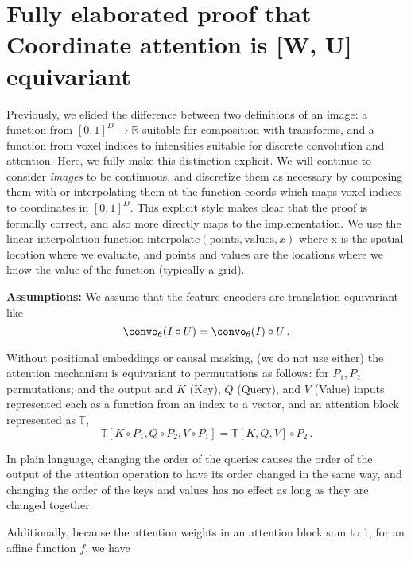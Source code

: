 \onecolumn

\section{Fully elaborated proof that Coordinate attention is [W, U] equivariant}


Previously, we elided the difference between two definitions of an image: a function from $[0, 1]^D \rightarrow \mathbb{R}$ suitable for composition with transforms, and a function from voxel indices to intensities suitable for discrete convolution and attention. Here, we fully make this distinction explicit. We will continue to consider \emph{images} to be continuous, and discretize them as necessary by composing them with or interpolating them at the function coords which maps voxel indices to coordinates in $[0, 1]^D$. This explicit style makes clear that the proof is formally correct, and also more directly maps to the implementation. We use the linear interpolation function $\text{interpolate}(\text{points}, \text{values}, x)$ where x is the spatial location where we evaluate, and points and values are the locations where we know the value of the function (typically a grid). 

\textbf{Assumptions:} We assume that the feature encoders are translation equivariant like
\begin{equation}
	\convo_\theta(I \circ U) = \convo_\theta(I) \circ U\,.
    \label{convperm}
\end{equation}




Without positional embeddings or causal masking, (we do not use
either) the attention mechanism is equivariant to permutations as follows: for $P_1, P_2$ permutations; and the output and $K$ (Key), $Q$ (Query), and $V$ (Value) inputs represented each as a function from an index to a vector, and an attention block represented as $\mathbb{T}$,
\begin{equation} \mathbb{T}[K \circ P_1, Q \circ P_2, V \circ P_1] = \mathbb{T}[K, Q, V] \circ P_2\,. \label{transperm2}\end{equation}

In plain language, changing the order of the queries causes the order of the output of the attention operation to have its order changed in the same way, and changing the order of the keys and values has no effect as long as they are changed together.

Additionally, because the attention weights in an attention block sum to 1, for an affine function $f$, we have 


